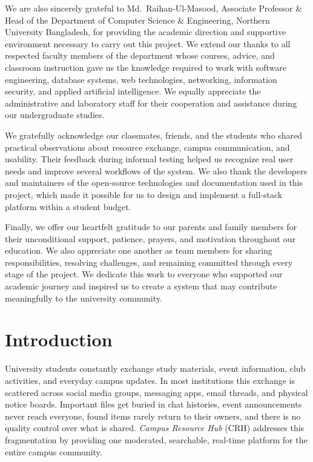 \documentclass[12pt,a4paper]{report}
\newcommand{\DeptHeadName}{Md.\ Raihan-Ul-Masood}
\begin{document}
We are also sincerely grateful to \DeptHeadName, Associate Professor
\& Head of the Department of Computer Science \& Engineering,
Northern University Bangladesh, for providing the academic direction
and supportive environment necessary to carry out this project. We
extend our thanks to all respected faculty members of the department
whose courses, advice, and classroom instruction gave us the
knowledge required to work with software engineering, database
systems, web technologies, networking, information security, and
applied artificial intelligence. We equally appreciate the
administrative and laboratory staff for their cooperation and
assistance during our undergraduate studies.

We gratefully acknowledge our classmates, friends, and the students
who shared practical observations about resource exchange, campus
communication, and usability. Their feedback during informal testing
helped us recognize real user needs and improve several workflows of
the system. We also thank the developers and maintainers of the
open-source technologies and documentation used in this project,
which made it possible for us to design and implement a full-stack
platform within a student budget.

Finally, we offer our heartfelt gratitude to our parents and family
members for their unconditional support, patience, prayers, and
motivation throughout our education. We also appreciate one another
as team members for sharing responsibilities, resolving challenges,
and remaining committed through every stage of the project. We
dedicate this work to everyone who supported our academic journey and
inspired us to create a system that may contribute meaningfully to
the university community.
\clearpage

\tableofcontents
\clearpage
\listoffigures
\clearpage
\listoftables
\clearpage


\chapter{Introduction}
University students constantly exchange study materials, event
information, club activities, and everyday campus updates. In most
institutions this exchange is scattered across social media groups,
messaging apps, email threads, and physical notice boards. Important
files get buried in chat histories, event announcements never reach
everyone, found items rarely return to their owners, and there is no
quality control over what is shared. \textit{Campus Resource Hub}
(CRH) addresses this fragmentation by providing one moderated,
searchable, real-time platform for the entire campus community.
\end{document}
